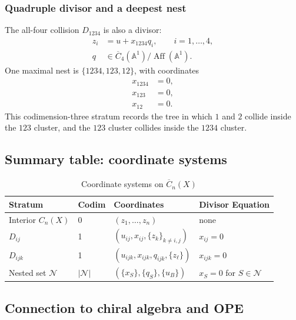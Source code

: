 \begin{example}
\subsubsection{Quadruple divisor and a deepest nest}

The all-four collision $D_{1234}$ is also a divisor:
\begin{align}
z_i&=u+x_{1234}q_i,\qquad i=1,\ldots,4,\\
q&\in\overline C_4(\mathbb{A}^1)/\operatorname{Aff}(\mathbb{A}^1).
\end{align}
One maximal nest is $\{1234,123,12\}$, with coordinates
\begin{align}
x_{1234}&=0,\\
x_{123}&=0,\\
x_{12}&=0.
\end{align}
This codimension-three stratum records the tree in which $1$ and $2$
collide inside the $123$ cluster, and the $123$ cluster collides inside
the $1234$ cluster.
\end{example}

\subsection{Summary table: coordinate systems}

\begin{table}[ht]
\centering
\caption{Coordinate systems on $\overline{C}_n(X)$}
\label{tab:coordinate-summary}
\begin{tabular}{|l|l|l|l|}
\hline
\textbf{Stratum} & \textbf{Codim} & \textbf{Coordinates} & \textbf{Divisor Equation} \\
\hline
Interior $C_n(X)$ & 0 & $(z_1, \ldots, z_n)$ & none \\
\hline
$D_{ij}$ & 1 & $(u_{ij},x_{ij},\{z_k\}_{k\neq i,j})$ & $x_{ij}=0$ \\
\hline
$D_{ijk}$ & 1 & $(u_{ijk},x_{ijk},q_{ijk},\{z_\ell\})$ & $x_{ijk}=0$ \\
\hline
Nested set $\mathcal N$ & $|\mathcal N|$ & $(\{x_S\},\{q_S\},\{u_B\})$ & $x_S=0$ for $S\in\mathcal N$ \\
\hline
\end{tabular}
\end{table}

\subsection{Connection to chiral algebra and OPE}

